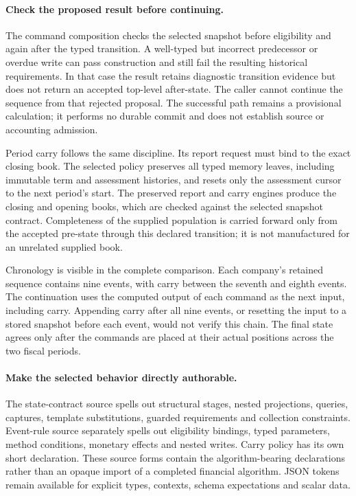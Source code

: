 \paragraph{Check the proposed result before continuing.}
The command composition checks the selected snapshot before eligibility and
again after the typed transition. A well-typed but incorrect predecessor or
overdue write can pass construction and still fail the resulting historical
requirements. In that case the result retains diagnostic transition evidence
but does not return an accepted top-level after-state. The caller cannot
continue the sequence from that rejected proposal. The successful path remains
a provisional calculation; it performs no durable commit and does not establish
source or accounting admission.

Period carry follows the same discipline. Its report request must bind to the
exact closing book. The selected policy preserves all typed memory leaves,
including immutable term and assessment histories, and resets only the
assessment cursor to the next period's start. The preserved report and carry
engines produce the closing and opening books, which are checked against the
selected snapshot contract. Completeness of the supplied population is carried
forward only from the accepted pre-state through this declared transition;
it is not manufactured for an unrelated supplied book.

Chronology is visible in the complete comparison. Each company's retained
sequence contains nine events, with carry between the seventh and eighth
events. The continuation uses the computed output of each command as the next
input, including carry. Appending carry after all nine events, or resetting
the input to a stored snapshot before each event, would not verify this chain.
The final state agrees only after the commands are placed at their actual
positions across the two fiscal periods.

\paragraph{Make the selected behavior directly authorable.}
The state-contract source spells out structural stages, nested projections,
queries, captures, template substitutions, guarded requirements and collection
constraints. Event-rule source separately spells out eligibility bindings,
typed parameters, method conditions, monetary effects and nested writes.
Carry policy has its own short declaration. These source forms contain the
algorithm-bearing declarations rather than an opaque import of a completed
financial algorithm. JSON tokens remain available for explicit types, contexts,
schema expectations and scalar data.

